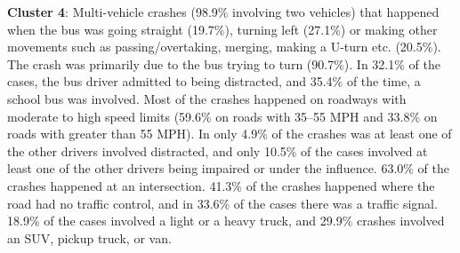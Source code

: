 \noindent
\textbf{Cluster 4}: Multi-vehicle crashes (98.9\% involving two vehicles) that happened when the bus was going straight (19.7\%), turning left (27.1\%) or making other movements such as passing/overtaking, merging, making a U-turn etc.   (20.5\%). The crash was primarily due to the bus trying to turn (90.7\%). In 32.1\% of the cases, the bus driver admitted to being distracted, and 35.4\% of the time, a school bus was involved. Most of the crashes happened on roadways with moderate to high speed limits (59.6\% on roads with 35--55 MPH and 33.8\% on roads with greater than 55 MPH). In only 4.9\% of the crashes was at least one of the other drivers involved distracted, and only 10.5\% of the cases involved at least one of the other drivers being impaired or under the influence. 63.0\% of the crashes happened at an intersection. 41.3\% of the crashes happened where the road had no traffic control, and in 33.6\% of the cases there was a traffic signal. 18.9\% of the cases involved a light or a heavy truck, and 29.9\% crashes involved an SUV, pickup truck, or van.

